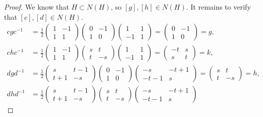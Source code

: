 \documentclass[11pt,a4paper]{article}
\begin{document}
{\begin{proof}
We know that $H \subset N(H)$, so $[g],[h] \in N(H)$. It remains to verify that $[c],[d] \in N(H)$.
\begin{align*}
cgc^{-1} &=\frac{1}{2} \begin{pmatrix} 1 & -1\\1 & 1 \end{pmatrix}  \begin{pmatrix} 0 & -1\\1 & 0 \end{pmatrix}\begin{pmatrix} 1 & 1\\-1 & 1 \end{pmatrix}
=\begin{pmatrix} 0 & -1\\1 & 0 \end{pmatrix} = g,\\
chc^{-1} &=\frac{1}{2} \begin{pmatrix} 1 & -1\\1 & 1 \end{pmatrix}  \begin{pmatrix} s& t \\t & -s \end{pmatrix}\begin{pmatrix} 1 & 1\\-1 & 1 \end{pmatrix}
=\begin{pmatrix} -t& s\\s& t \end{pmatrix}  = k,\\
dgd^{-1} &=\frac{1}{2} \begin{pmatrix} s & t-1\\t+1 & -s \end{pmatrix}  \begin{pmatrix} 0 & -1\\1 & 0 \end{pmatrix}  \begin{pmatrix} -s & -t+1\\-t-1 & s \end{pmatrix}
= \begin{pmatrix} s& t \\t & -s \end{pmatrix} = h,\\
dhd^{-1} &= \frac{1}{2} \begin{pmatrix} s & t-1\\t+1 & -s \end{pmatrix}  \begin{pmatrix} s& t \\t & -s \end{pmatrix}  \begin{pmatrix} -s & -t+1\\-t-1 & s \end{pmatrix}

\end{align*}
\end{proof}}
\end{document}
